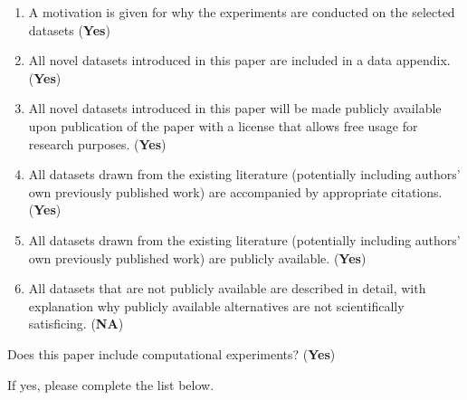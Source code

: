 \begin{enumerate}
    \item A motivation is given for why the experiments are conducted on the selected datasets (\textbf{Yes})
    \item All novel datasets introduced in this paper are included in a data appendix.  (\textbf{Yes})
    \item All novel datasets introduced in this paper will be made publicly available upon publication of the paper with a license that allows free usage for research purposes.  (\textbf{Yes})
    \item All datasets drawn from the existing literature (potentially including authors’ own previously published work) are accompanied by appropriate citations.  (\textbf{Yes})
    \item All datasets drawn from the existing literature (potentially including authors’ own previously published work) are publicly available. (\textbf{Yes})
    \item All datasets that are not publicly available are described in detail, with explanation why publicly available alternatives are not scientifically satisficing. (\textbf{NA})
\end{enumerate}

\noindent Does this paper include computational experiments? (\textbf{Yes})

\noindent If yes, please complete the list below.

